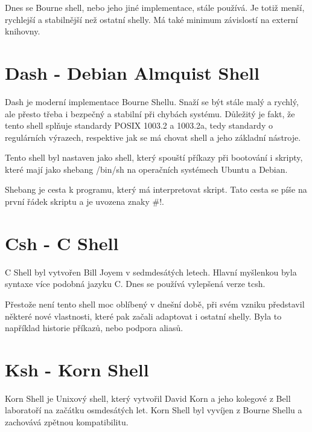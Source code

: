 \documentclass[thesis=M,czech]{FITthesis}[2012/06/26]
\begin{document}
Dnes se Bourne shell, nebo jeho jiné implementace, stále používá. Je totiž menší, rychlejší a stabilnější než ostatní shelly. Má také minimum závislostí na externí knihovny.

%
%
%
\section{Dash - Debian Almquist Shell}

Dash je moderní implementace Bourne Shellu. Snaží se být stále malý a rychlý, ale přesto třeba i bezpečný a stabilní při chybách systému. Důležitý je fakt, že tento shell splňuje standardy POSIX 1003.2 a 1003.2a, tedy standardy o regulárních výrazech, respektive jak se má chovat shell a jeho základní nástroje.

Tento shell byl nastaven jako shell, který spouští příkazy při bootování i skripty, které mají jako shebang /bin/sh na operačních systémech Ubuntu a Debian.

Shebang je cesta k programu, který má interpretovat skript. Tato cesta se píše na první řádek skriptu a je uvozena znaky $\#!$.



%
%
%
\section{Csh - C Shell}

C Shell byl vytvořen Bill Joyem v sedmdesátých letech. Hlavní myšlenkou byla syntaxe více podobná jazyku C. Dnes se používá vylepšená verze tcsh.

Přestože není tento shell moc oblíbený v dnešní době, při svém vzniku představil některé nové vlastnosti, které pak začali adaptovat i ostatní shelly. Byla to například historie příkazů, nebo podpora aliasů.




%
%
%
\section{Ksh - Korn Shell}

Korn Shell je Unixový shell, který vytvořil David Korn a jeho kolegové z Bell laboratoří na začátku osmdesátých let. Korn Shell byl vyvíjen z Bourne Shellu a zachovává zpětnou kompatibilitu.
\end{document}
